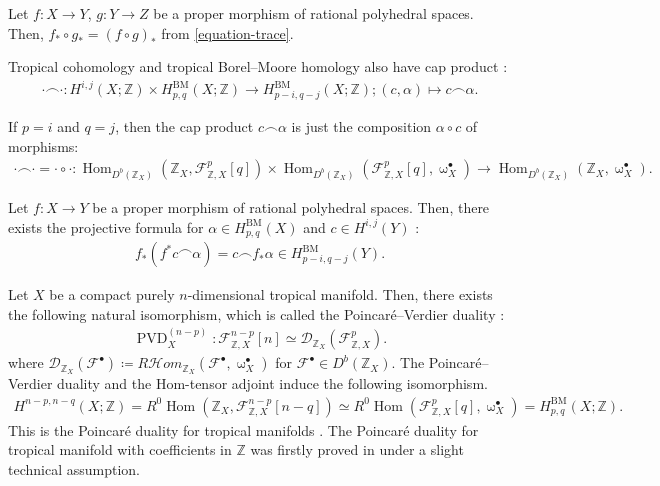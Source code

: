 \documentclass[a4paper,dvipdfmx,reqno,12pt]{amsart}
\theoremstyle{definition}
\newcommand{\deq}{\coloneqq}
\newcommand{\opn}[1]{\operatorname{#1}}
\numberwithin{equation}{section}
\begin{document}
Let $f\colon X\to Y$, $g\colon Y\to Z$ be a proper 
morphism of rational polyhedral spaces.
Then, $f_*\circ g_*=(f\circ g)_*$ from 
\cref{equation-trace}.

Tropical cohomology and tropical Borel--Moore homology 
also have cap product 
\cite[]{gross2019sheaftheoretic}:
\begin{align}
\cdot \frown \cdot \colon
H^{i,j}(X;\mathbb{Z}) \times 
H_{p,q}^{\mathrm{BM}}(X;\mathbb{Z})\to 
H_{p-i,q-j}^{\mathrm{BM}}(X;\mathbb{Z});(c,\alpha) 
\mapsto c\frown \alpha.
\end{align}

If $p=i$ and $q=j$, then the cap product $c\frown \alpha$ 
is just the composition $\alpha \circ c$ of 
morphisms:
\begin{align} \label{equation-composition-cap}
\cdot \frown \cdot =\cdot \circ \cdot \colon
\opn{Hom}_{D^{b}(\mathbb{Z}_X)}(
\mathbb{Z}_X,\mathcal{F}^{p}_{\mathbb{Z},X}[q])\times
\opn{Hom}_{D^{b}(\mathbb{Z}_X)}
(\mathcal{F}^{p}_{\mathbb{Z},X}[q],\upomega_X^{\bullet})
\to 
\opn{Hom}_{D^{b}(\mathbb{Z}_X)}(\mathbb{Z}_X,
\upomega_X^{\bullet}).
\end{align}

Let $f\colon X \to Y $ be a proper morphism of 
rational polyhedral spaces.
Then, there exists the projective formula 
for $\alpha\in H_{p,q}^{\mathrm{BM}}(X)$
and $c\in H^{i,j}(Y)$ 
\cite[Proposition 4.18]{gross2019sheaftheoretic}:
\begin{align}
  f_*(f^{*}c\frown \alpha)=
c\frown f_*\alpha\in H_{p-i,q-j}^{\opn{BM}}(Y).
\end{align}



Let $X$ be a compact
purely $n$-dimensional tropical manifold.
Then, there exists the following natural isomorphism, 
which is called the Poincar\'e--Verdier duality 
\cite[Theorem 6.2]{gross2019sheaftheoretic}:
\begin{align}
\opn{PVD}^{(n-p)}_X\colon \mathcal{F}_{\mathbb{Z},X}^{n-p}[n]
\simeq 
\mathcal{D}_{\mathbb{Z}_X}(\mathcal{F}_{\mathbb{Z},X}^{p}).
\end{align}
where $\mathcal{D}_{\mathbb{Z}_X}(\mathcal{F}^{\bullet})
\deq R\mathcal{H}om_{\mathbb{Z}_X}(\mathcal{F}^{\bullet}
,\upomega^{\bullet}_X)$ for 
$\mathcal{F}^{\bullet}\in D^{b}(\mathbb{Z}_X)$.
The Poincar\'e--Verdier duality and the 
Hom-tensor adjoint induce
the following isomorphism.
\begin{align}
H^{n-p,n-q}(X;\mathbb{Z})=
R^{0}\opn{Hom}(\mathbb{Z}_X,
\mathcal{F}_{\mathbb{Z},X}^{n-p}[n-q])\simeq 
R^{0}\opn{Hom}(\mathcal{F}_{\mathbb{Z},X}^{p}[q],
\upomega_{X}^{\bullet})=
H_{p,q}^{\mathrm{BM}}(X;\mathbb{Z}).
\end{align}
This is the Poincar\'e duality
for tropical manifolds 
\cite[Corollary 6.3]{gross2019sheaftheoretic}.
The Poincar\'e duality for tropical manifold
with coefficients in $\mathbb{Z}$ was firstly 
proved in \cite[Theorem 5.3]{MR3894860}
under a slight technical assumption.
\end{document}
